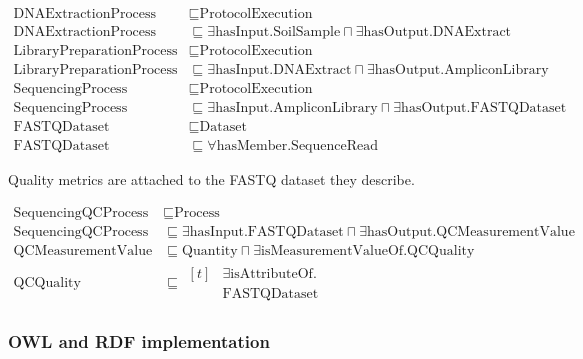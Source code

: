 \begin{revision}
\begin{small}
\begin{align}
	\label{eq:sequencing}
	\text{DNAExtractionProcess} & \sqsubseteq \text{ProtocolExecution} \\
	\text{DNAExtractionProcess} & \sqsubseteq \exists
	    \text{hasInput}.\text{SoilSample} \sqcap \exists
	    \text{hasOutput}.\text{DNAExtract} \\
	\text{LibraryPreparationProcess} & \sqsubseteq \text{ProtocolExecution} \\
	\text{LibraryPreparationProcess} & \sqsubseteq \exists
	    \text{hasInput}.\text{DNAExtract} \sqcap \exists
	    \text{hasOutput}.\text{AmpliconLibrary} \\
	\text{SequencingProcess} & \sqsubseteq \text{ProtocolExecution} \\
	\text{SequencingProcess} & \sqsubseteq \exists
	    \text{hasInput}.\text{AmpliconLibrary} \sqcap \exists
	    \text{hasOutput}.\text{FASTQDataset} \\
	\text{FASTQDataset} & \sqsubseteq \text{Dataset} \\
	\text{FASTQDataset} & \sqsubseteq \forall
	    \text{hasMember}.\text{SequenceRead}
\end{align}
\end{small}

Quality metrics are attached to the FASTQ dataset they describe.

\begin{small}
\begin{align}
	\label{eq:qc}
	\text{SequencingQCProcess} & \sqsubseteq \text{Process} \\
	\text{SequencingQCProcess} & \sqsubseteq \exists
	    \text{hasInput}.\text{FASTQDataset} \sqcap \exists
	    \text{hasOutput}.\text{QCMeasurementValue} \\
	\text{QCMeasurementValue} & \sqsubseteq \text{Quantity} \sqcap
	    \exists \text{isMeasurementValueOf}.\text{QCQuality} \\
	\text{QCQuality} & \sqsubseteq
	    \begin{aligned}[t]
	    &\exists \text{isAttributeOf}.{}\\[-0.25ex]
	    &\text{FASTQDataset}
	    \end{aligned}
\end{align}
\end{small}



\subsubsection{OWL and RDF implementation}\label{subsec:owl_rdf}


\end{revision}
